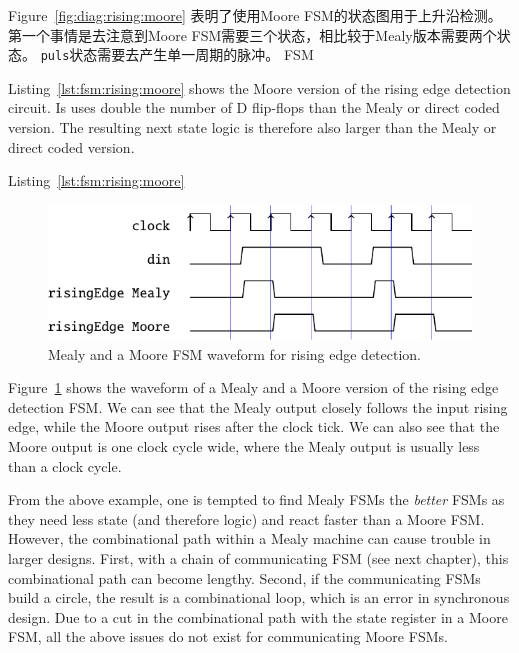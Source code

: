 \documentclass[%
    10pt,
    headinclude, footexclude,
    openright, %
    notitlepage,
    cleardoubleempty,
    headsepline,
    pointlessnumbers,
    bibtotoc, idxtotoc,
    ]{scrbook}
\newcommand{\code}[1]{{\small{\texttt{#1}}}}
\begin{document}
{Figure~\ref{fig:diag:rising:moore} 表明了使用Moore FSM的状态图用于上升沿检测。
第一个事情是去注意到Moore FSM需要三个状态，相比较于Mealy版本需要两个状态。
\code{puls}状态需要去产生单一周期的脉冲。
FSM


Listing~\ref{lst:fsm:rising:moore} shows the Moore version of the rising edge detection
circuit. Is uses double the number of D flip-flops than the Mealy or direct
coded version. The resulting next state logic is therefore also larger
than the Mealy or direct coded version.

Listing~\ref{lst:fsm:rising:moore}



\begin{figure}
  \centering
  \includegraphics[scale=1]{figures/rising}
  \caption{Mealy and a  Moore FSM waveform for rising edge detection.}
  \label{fig:rising}
\end{figure}

Figure~\ref{fig:rising} shows the waveform of a Mealy and a  Moore version
of the rising edge detection FSM. We can see that the Mealy output closely
follows the input rising edge, while the Moore output rises after the clock tick.
We can also see that the Moore output is one clock cycle wide, where the Mealy
output is usually less than a clock cycle.

From the above example, one is tempted to find Mealy FSMs the \emph{better}
FSMs as they need less state (and therefore logic) and react faster than a Moore FSM.
However, the combinational path within a Mealy machine can cause trouble in
larger designs. First, with a chain of communicating FSM (see next chapter), this
combinational path can become lengthy. Second, if the communicating FSMs build
a circle, the result is a combinational loop, which is an error in synchronous design.
Due to a cut in the combinational path with the state register in a Moore FSM,
all the above issues do not exist for communicating Moore FSMs.

}
\end{document}
